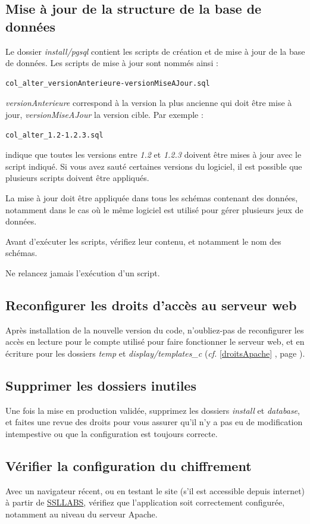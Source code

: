 \subsection{Mise à jour de la structure de la base de données}

Le dossier \textit{install/pgsql} contient les scripts de création et de mise à jour de la base de données. Les scripts de mise à jour sont nommés ainsi :
\begin{lstlisting}
col_alter_versionAnterieure-versionMiseAJour.sql
\end{lstlisting}

\textit{versionAnterieure} correspond à la version la plus ancienne qui doit être mise à jour, \textit{versionMiseAJour} la version cible. Par exemple :
\begin{lstlisting}
col_alter_1.2-1.2.3.sql
\end{lstlisting}
indique que toutes les versions entre \textit{1.2} et \textit{1.2.3} doivent être mises à jour avec le script indiqué. Si vous avez \og sauté \fg{} certaines versions du logiciel, il est possible que plusieurs scripts doivent être appliqués.

La mise à jour doit être appliquée dans tous les schémas contenant des données, notamment dans le cas où le même logiciel est utilisé pour gérer plusieurs jeux de données.

Avant d'exécuter les scripts, vérifiez leur contenu, et notamment le nom des schémas.

Ne relancez jamais l'exécution d'un script.

\subsection{Reconfigurer les droits d'accès au serveur web}

Après installation de la nouvelle version du code, n'oubliez-pas de reconfigurer les accès en lecture pour le compte utilisé pour faire fonctionner le serveur web, et en écriture pour les dossiers \textit{temp} et \textit{display/templates\_c} (\textit{cf.} \ref{droitsApache} \textit{}, page \pageref{droitsApache}).

\subsection{Supprimer les dossiers inutiles}
Une fois la mise en production validée, supprimez les dossiers \textit{install} et \textit{database}, et faites une revue des droits pour vous assurer qu'il n'y a pas eu de modification intempestive ou que la configuration est toujours correcte.

\subsection{Vérifier la configuration du chiffrement}
Avec un navigateur récent, ou en testant le site (s'il est accessible depuis internet) à partir de \href{https://www.ssllabs.com/ssltest/}{SSLLABS}, vérifiez que l'application soit correctement configurée, notamment au niveau du serveur Apache.